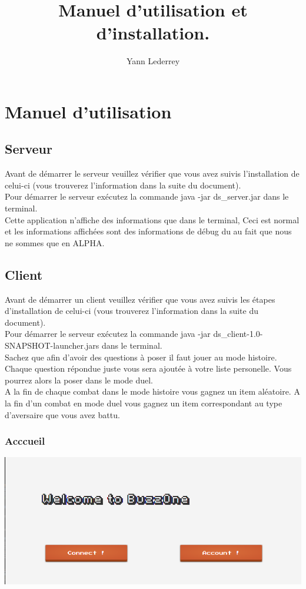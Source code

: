 \documentclass[a4paper,10pt]{report}
\title{Manuel d'utilisation et d'installation.}
\author{Yann Lederrey}
\begin{document}
\maketitle

\chapter{Manuel d'utilisation}
\section{Serveur}
Avant de démarrer le serveur veuillez vérifier que vous avez suivis l'installation de celui-ci (vous trouverez l'information dans la suite du document).\\
Pour démarrer le serveur exécutez la commande java -jar ds\_server.jar dans le terminal.\\
Cette application n'affiche des informations que dans le terminal, Ceci est 
normal et les informations affichées sont des informations de débug du au fait que nous ne sommes que en ALPHA.

\section{Client}
Avant de démarrer un client veuillez vérifier que vous avez suivis les étapes d'installation de celui-ci (vous trouverez l'information dans la suite du document).\\
Pour démarrer le serveur exécutez la commande java -jar ds\_client-1.0-SNAPSHOT-launcher.jars dans le terminal.\\
Sachez que afin d'avoir des questions à poser il faut jouer au mode histoire. Chaque question répondue juste vous sera ajoutée à votre liste personelle. Vous pourrez alors la 
poser dans le mode duel.\\
A la fin de chaque combat dans le mode histoire vous gagnez un item aléatoire. A la fin d'un combat en mode duel vous gagnez un item correspondant au type d'aversaire que vous avez battu.
\subsection{Acccueil}
\includegraphics[scale=0.3]{images/AccountConnect.png}
\end{document}
